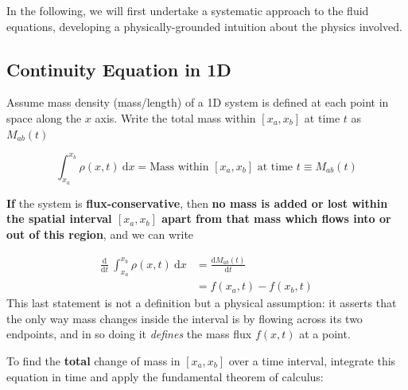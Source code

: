 \documentclass[notoc]{tufte-handout}
\begin{document}
In the following, we will first undertake a systematic approach to the fluid equations, developing a physically-grounded intuition about the physics involved.


\subsection{Continuity Equation in 1D}

Assume mass density (mass/length) of a 1D system is  defined at each point in space along the $x$ axis. Write the total mass within $[x_a,x_b]$  at time $t$ as $M_{ab}(t)$

     \begin{equation}
        \int_{x_a}^{x_b} \rho ({x},t)~\mathrm{d}x = \text{Mass within }[x_a,x_b] \text{ at time }t \equiv M_{ab}(t)
    \end{equation}
%

{\bf If} the system is {\bf flux-conservative}, then {\bf no mass is added or lost within the spatial interval $[x_a,x_b]$ apart from that mass which flows into or out of this region}, and we can write

\begin{align}
\frac{\mathrm{d}}{\mathrm{d}t }~\int_{x_a}^{x_b} \rho ({x},t)~\mathrm{d}x & = \frac{\mathrm{d}M_{ab}(t)}{\mathrm{d}t } \\
& = f(x_a,t) - f(x_b,t)
\end{align}
%
This last statement is not a definition but a physical assumption: it asserts that the only way mass changes inside the interval is by flowing across its two endpoints, and in so doing it {\it defines} the mass flux $f(x,t)$ at a point.

To find the {\bf total} change of mass in $[x_a,x_b]$ over a time interval, integrate this equation in time and apply the fundamental theorem of calculus:
\end{document}

